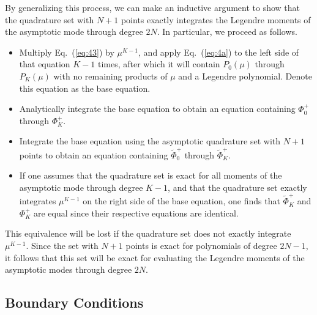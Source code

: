 \documentclass[12pt]{article}
\newcommand{\EQ}[1]{Eq.~(\ref{eq:#1})}
\newcommand{\bc}{\begin{center}}
\newcommand{\ec}{\end{center}}
\begin{document}
By generalizing this process, we can make an inductive argument to show that the quadrature set with $N+1$ points exactly integrates the Legendre 
moments of the asymptotic mode through degree $2N$.  In particular, we proceed as follows.
\begin{itemize}  
\item Multiply \EQ{43} by $\mu^{K-1}$, and apply \EQ{4a} to the left side of that equation $K-1$ times, after which it will contain  
$P_{0}(\mu)$ through $P_{K}(\mu)$ with no remaining products of $\mu$ and a Legendre polynomial.  Denote this equation as the base equation. 
\item Analytically integrate the base equation to obtain an equation containing $\Phi^{+}_0$ through $\Phi^{+}_K $. 
\item Integrate the base equation using the asymptotic quadrature set with $N+1$ points to obtain an equation containing $\tilde{\Phi}^{+}_0$ through 
$\tilde{\Phi}^{+}_K$.  
\item If one assumes that the quadrature set is exact for all moments of the asymptotic mode through degree $K-1$, and that the quadrature set 
exactly integrates $\mu^{K-1}$ on the right side of the base equation, one finds that $\tilde{\Phi}^{+}_K$ and $\Phi^{+}_K$ are equal since their respective equations 
are identical.
\end{itemize}
This equivalence will be lost if the quadrature set does not exactly integrate $\mu^{K-1}$.  Since the set with $N+1$ points is exact for polynomials 
of degree $2N-1$, it follows that this set will be exact for evaluating the Legendre moments of the asymptotic modes through degree $2N$.


\subsection{Boundary Conditions}
\end{document}
